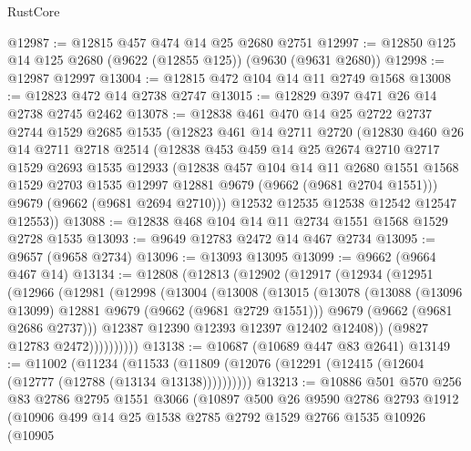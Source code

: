 \begin{lexlean}{RustCore}
\begin{coremodule}
@12987 := @12815 @457 @474 @14 @25 @2680 @2751
@12997 := @12850 @125 @14 @125 @2680 (@9622 (@12855 @125)) (@9630 (@9631 @2680))
@12998 := @12987 @12997
@13004 := @12815 @472 @104 @14 @11 @2749 @1568
@13008 := @12823 @472 @14 @2738 @2747
@13015 := @12829 @397 @471 @26 @14 @2738 @2745 @2462
@13078 := @12838
    @461
    @470
    @14
    @25
    @2722
    @2737
    @2744
    @1529
    @2685
    @1535
    (@12823
      @461
      @14
      @2711
      @2720
      (@12830
        @460
        @26
        @14
        @2711
        @2718
        @2514
        (@12838
          @453
          @459
          @14
          @25
          @2674
          @2710
          @2717
          @1529
          @2693
          @1535
          @12933
          (@12838
            @457
            @104
            @14
            @11
            @2680
            @1551
            @1568
            @1529
            @2703
            @1535
            @12997
            @12881
            @9679
            (@9662 (@9681 @2704 @1551)))
          @9679
          (@9662 (@9681 @2694 @2710)))
        @12532
        @12535
        @12538
        @12542
        @12547
        @12553))
@13088 := @12838 @468 @104 @14 @11 @2734 @1551 @1568 @1529 @2728 @1535
@13093 := @9649 @12783 @2472 @14 @467 @2734
@13095 := @9657 (@9658 @2734)
@13096 := @13093 @13095
@13099 := @9662 (@9664 @467 @14)
@13134 := @12808
    (@12813
      (@12902
        (@12917
          (@12934
            (@12951
              (@12966
                (@12981
                  (@12998
                    (@13004
                      (@13008
                        (@13015
                          (@13078
                            (@13088 (@13096 @13099) @12881 @9679 (@9662 (@9681 @2729 @1551)))
                            @9679
                            (@9662 (@9681 @2686 @2737)))
                          @12387
                          @12390
                          @12393
                          @12397
                          @12402
                          @12408))
                      (@9827 @12783 @2472))))))))))
@13138 := @10687 (@10689 @447 @83 @2641)
@13149 := @11002
    (@11234 (@11533 (@11809 (@12076 (@12291 (@12415 (@12604 (@12777 (@12788 (@13134 @13138))))))))))
@13213 := @10886
    @501
    @570
    @256
    @83
    @2786
    @2795
    @1551
    @3066
    (@10897
      @500
      @26
      @9590
      @2786
      @2793
      @1912
      (@10906
        @499
        @14
        @25
        @1538
        @2785
        @2792
        @1529
        @2766
        @1535
        @10926
        (@10905

\end{coremodule}
\end{lexlean}
